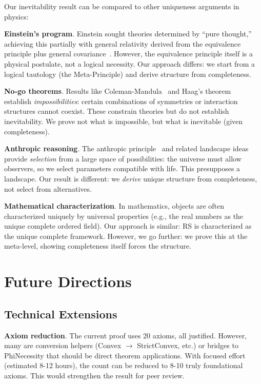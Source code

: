 \documentclass[12pt]{article}
\theoremstyle{remark}
\begin{document}
Our inevitability result can be compared to other uniqueness arguments in physics:

\textbf{Einstein's program}. Einstein sought theories determined by ``pure thought,'' achieving this partially with general relativity derived from the equivalence principle plus general covariance~\cite{Einstein1916}. However, the equivalence principle itself is a physical postulate, not a logical necessity. Our approach differs: we start from a logical tautology (the Meta-Principle) and derive structure from completeness.

\textbf{No-go theorems}. Results like Coleman-Mandula~\cite{ColemanMandula1967} and Haag's theorem~\cite{Haag1955} establish \emph{impossibilities}: certain combinations of symmetries or interaction structures cannot coexist. These constrain theories but do not establish inevitability. We prove not what is impossible, but what is inevitable (given completeness).

\textbf{Anthropic reasoning}. The anthropic principle~\cite{Barrow1986} and related landscape ideas~\cite{Susskind2003} provide \emph{selection} from a large space of possibilities: the universe must allow observers, so we select parameters compatible with life. This presupposes a landscape. Our result is different: we \emph{derive} unique structure from completeness, not select from alternatives.

\textbf{Mathematical characterization}. In mathematics, objects are often characterized uniquely by universal properties (e.g., the real numbers as the unique complete ordered field). Our approach is similar: RS is characterized as the unique complete framework. However, we go further: we prove this at the meta-level, showing completeness itself forces the structure.

\section{Future Directions}

\subsection{Technical Extensions}

\textbf{Axiom reduction}. The current proof uses 20 axioms, all justified. However, many are conversion helpers (Convex $\to$ StrictConvex, etc.) or bridges to PhiNecessity that should be direct theorem applications. With focused effort (estimated 8-12 hours), the count can be reduced to 8-10 truly foundational axioms. This would strengthen the result for peer review.
\end{document}
